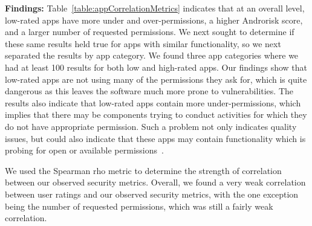 \documentclass{sig-alternate-05-2015}
\begin{document}







\textbf{Findings:} Table~\ref{table:appCorrelationMetrics} indicates that at an overall level, low-rated apps have more under and over-permissions, a higher Androrisk score, and a larger number of requested permissions. We next sought to determine if these same results held true for apps with similar functionality, so we next separated the results by app category. We found three app categories where we had at least 100 results for both low and high-rated apps. Our findings show that low-rated apps are not using many of the permissions they ask for, which is quite dangerous as this leaves the software much more prone to vulnerabilities. The results also indicate that low-rated apps contain more under-permissions, which implies that there may be components trying to conduct activities for which they do not have appropriate permission. Such a problem not only indicates quality issues, but could also indicate that these apps may contain functionality which is probing for open or available permissions~\cite{7371575, Grace:2012:UEA:2185448.2185464}.

We used the Spearman rho metric to determine the strength of correlation between our observed security metrics. Overall, we found a very weak correlation between user ratings and our observed security metrics, with the one exception being the number of requested permissions, which was still a fairly weak correlation.


%

\end{document}
